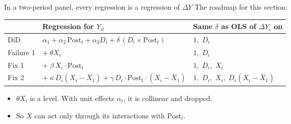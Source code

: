 \documentclass[
  11pt,
  ignorenonframetext,
  aspectratio=169,
]{beamer}
\providecommand{\tightlist}{%
  \setlength{\itemsep}{0pt}\setlength{\parskip}{0pt}}
\begin{document}
\begin{frame}{In a two-period panel, every regression is a regression of
\(\Delta Y\)}
\protect{}\label{in-a-two-period-panel-every-regression-is-a-regression-of-delta-y}
The roadmap for this section:

\begin{center}\small
\begin{tabular}{lll}
\toprule
 & Regression for $Y_{it}$ & Same $\delta$ as OLS of $\Delta Y_i$ on \\
\midrule
DiD & $\alpha_1 + \alpha_2\,\text{Post}_t + \alpha_3 D_i + \delta\,(D_i \times \text{Post}_t)$ & $1,\; D_i$ \\
Failure 1 & $+\;\theta X_i$ & $1,\; D_i$ \\
Fix 1 & $+\;\beta\, X_i \cdot \text{Post}_t$ & $1,\; D_i,\; X_i$ \\
Fix 2 & $+\;\kappa\, D_i (X_i - \bar X_1) + \gamma\, D_i \cdot \text{Post}_t \cdot (X_i - \bar X_1)$ & $1,\; D_i,\; X_i,\; D_i (X_i - \bar X_1)$ \\
\bottomrule
\end{tabular}
\end{center}

\begin{itemize}
\tightlist
\item
  \(\theta X_i\) is a level. With unit effects \(\alpha_i\), it is
  collinear and dropped.
\item
  So \(X\) can act only through its interactions with \(\text{Post}_t\).
\end{itemize}
\end{frame}
\end{document}
